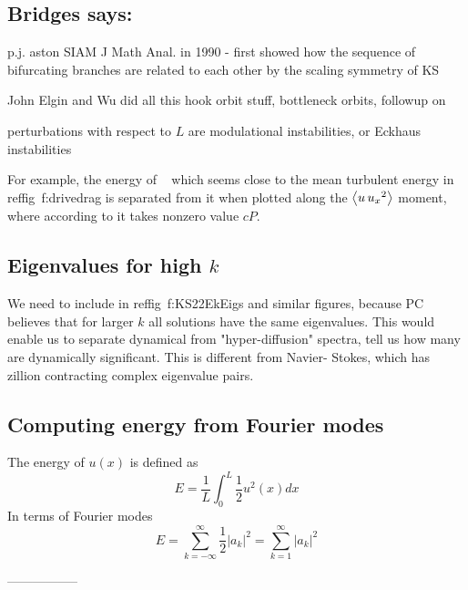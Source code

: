 \subsection{Bridges says:}

p.j. aston SIAM J Math Anal. in 1990 - first showed how the sequence of bifurcating branches
are related to each other by the scaling symmetry of KS

John Elgin and Wu did all this hook orbit stuff, bottleneck orbits, followup on

perturbations with respect to $L$ are modulational instabilities, or Eckhaus  instabilities

For example, the energy of \reqva\  which
seems close to the
mean turbulent energy in reffig~{f:drivedrag} is separated
from it when plotted along the
$\left\langle {u \, u_{x}{}^2} \right\rangle$ moment, where according to
 it takes nonzero value $c P$.

\subsection{Eigenvalues for high $k$}

We need to include  
in reffig~{f:KS22EkEigs} and similar figures, because
PC believes that for larger $k$ all solutions have the same eigenvalues. This
    would enable us to separate dynamical from "hyper-diffusion" spectra,
    tell us how many are dynamically significant. This is different from Navier-
Stokes,
    which has zillion contracting complex eigenvalue pairs.

\subsection{Computing energy from Fourier modes}
The energy of $u(x)$ is defined as
\[
   E = \frac{1}{L}\int_0^L \textstyle\frac{1}{2}u^2(x) dx
\]
In terms of Fourier modes
\[
   E = \sum_{k=-\infty}^\infty {\textstyle\frac{1}{2}}|a_k|^2 =
   \sum_{k=1}^\infty |a_k|^2
\]

-----------------


